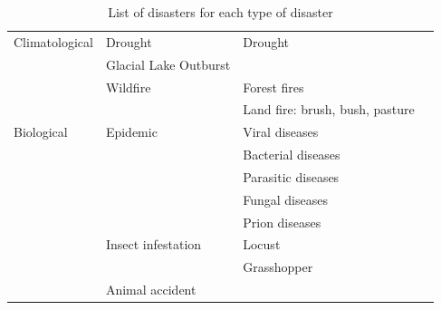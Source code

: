 \documentclass{article}
\begin{document}
\begin{table}[H]
\begin{tabular}{p{2.5cm}p{2.5cm}p{2.5cm}p{2.5cm}}
    \midrule
    Climatological & Drought & Drought &\\ \cmidrule{2-4}
    & Glacial Lake Outburst && \\ \cmidrule{2-4}
    & Wildfire & Forest fires & \\
    && Land fire: brush, bush, pasture &\\
    \midrule
    Biological & Epidemic & Viral diseases &\\
    && Bacterial diseases & \\
    && Parasitic diseases & \\
    && Fungal diseases & \\
    && Prion diseases & \\ \cmidrule{2-4}
    & Insect infestation & Locust & \\
    & & Grasshopper & \\ \cmidrule{2-4}
    & Animal accident \\
    \bottomrule
    \end{tabular}
    \caption{List of disasters for each type of disaster}
    \label{tab:disasters}
\end{table}
\end{document}
